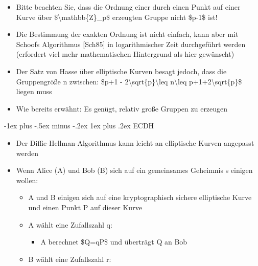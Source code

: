 \documentclass[a4paper]{article}
\makeatletter
\renewcommand{\subsubsection}{\@startsection{subsubsection}{3}{0mm}%
 {-1ex plus -.5ex minus -.2ex}%
 {1ex plus .2ex}%
 {\normalfont\small\bfseries}}
\makeatother
\begin{document}
\begin{multicols}{3}
    \begin{itemize}
        \item
              Bitte beachten Sie, dass die Ordnung einer durch einen Punkt auf einer
              Kurve über \$\textbackslash mathbb\{Z\}\_p\$ erzeugten Gruppe nicht
              \$p-1\$ ist!
        \item
              Die Bestimmung der exakten Ordnung ist nicht einfach, kann aber mit
              Schoofs Algorithmus {[}Sch85{]} in logarithmischer Zeit durchgeführt
              werden (erfordert viel mehr mathematischen Hintergrund als hier
              gewünscht)
        \item
              Der Satz von Hasse über elliptische Kurven besagt jedoch, dass die
              Gruppengröße n zwischen: \$p+1 -
              2\textbackslash sqrt\{p\}\textbackslash leq n\textbackslash leq
              p+1+2\textbackslash sqrt\{p\}\$ liegen muss
        \item
              Wie bereits erwähnt: Es genügt, relativ große Gruppen zu erzeugen
    \end{itemize}


    \subsubsection{ECDH}

    \begin{itemize}
        \item
              Der Diffie-Hellman-Algorithmus kann leicht an elliptische Kurven
              angepasst werden
        \item
              Wenn Alice (A) und Bob (B) sich auf ein gemeinsames Geheimnis s
              einigen wollen:

              \begin{itemize}
                  \item
                        A und B einigen sich auf eine kryptographisch sichere elliptische
                        Kurve und einen Punkt P auf dieser Kurve
                  \item
                        A wählt eine Zufallszahl q:

                        \begin{itemize}
                            \item
                                  A berechnet \$Q=qP\$ und überträgt Q an Bob
                        \end{itemize}
                  \item
                        B wählt eine Zufallszahl r:


\end{itemize}
\end{itemize}
\end{multicols}
\end{document}
